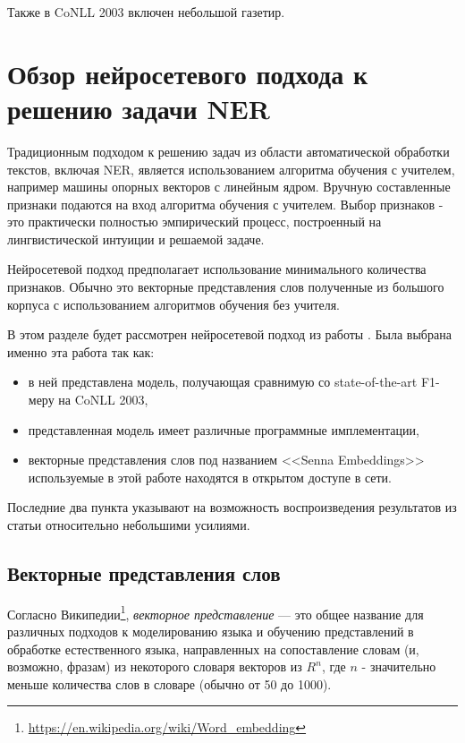   Также в CoNLL 2003 включен небольшой газетир.

  \section{Обзор нейросетевого подхода к решению задачи NER}  \label{section:nn}

  Традиционным подходом к решению задач из области автоматической обработки текстов,
  включая NER, является использованием алгоритма обучения с учителем, например
  машины опорных векторов с линейным ядром. Вручную составленные признаки подаются на вход
  алгоритма обучения с учителем. Выбор признаков - это практически полностью эмпирический
  процесс, построенный на лингвистической интуиции и решаемой задаче.

  Нейросетевой подход предполагает использование минимального количества признаков.
  Обычно это векторные представления слов полученные из большого корпуса с использованием
  алгоритмов обучения без учителя.

  В этом разделе будет рассмотрен нейросетевой подход из работы
  \citep{collobert2011natural}. Была выбрана именно эта работа так как:
  \begin{itemize}
  \item в ней представлена модель, получающая сравнимую со state-of-the-art F1-меру на CoNLL 2003,
  \item представленная модель имеет различные программные имплементации,
  \item векторные представления слов под названием <<Senna Embeddings>>
    используемые в этой работе находятся в открытом доступе в сети.
  \end{itemize}
  Последние два пункта указывают на возможность воспроизведения результатов из статьи относительно небольшими усилиями.

  \subsection{Векторные представления слов}

  Согласно Википедии\footnote{\url{https://en.wikipedia.org/wiki/Word_embedding}},
  \textit{векторное представление} — это общее название для различных
  подходов к моделированию языка и обучению представлений в обработке естественного языка,
  направленных на сопоставление словам (и, возможно, фразам) из некоторого словаря
  векторов из $R^n$, где $n$ - значительно меньше количества слов в словаре (обычно от 50 до 1000).

